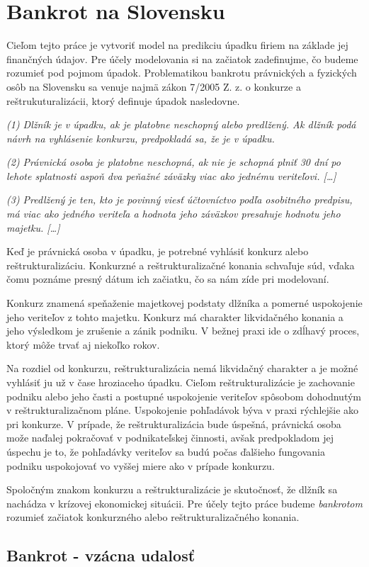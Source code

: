 \section{Bankrot na Slovensku}
\label{bankruptcy}

Cieľom tejto práce je vytvoriť model na predikciu úpadku firiem na základe jej finančných údajov.
Pre účely modelovania si na začiatok zadefinujme, čo budeme rozumieť pod pojmom úpadok.
Problematikou bankrotu právnických a fyzických osôb na Slovensku sa venuje najmä zákon 7/2005 Z. z. o konkurze a reštrukuturalizácii,
ktorý definuje úpadok nasledovne.

\bigskip
\textit{(1)
Dlžník je v úpadku, ak je platobne neschopný alebo predlžený. Ak dlžník podá návrh na vyhlásenie konkurzu, predpokladá sa, že je v úpadku.}

\textit{(2)
Právnická osoba je platobne neschopná, ak nie je schopná plniť 30 dní po lehote splatnosti aspoň dva peňažné záväzky viac ako jednému veriteľovi. […]}

\textit{(3)
Predlžený je ten, kto je povinný viesť účtovníctvo podľa osobitného predpisu, má viac ako jedného veriteľa a hodnota jeho záväzkov presahuje hodnotu jeho majetku. […]}
\bigskip

Keď je právnická osoba v úpadku, je potrebné vyhlásiť konkurz alebo reštrukturalizáciu.
Konkurzné a reštrukturalizačné konania schvaľuje súd, vďaka čomu poznáme presný dátum ich začiatku, čo sa nám zíde pri modelovaní.

Konkurz znamená speňaženie majetkovej podstaty dlžníka a pomerné uspokojenie jeho veriteľov z tohto majetku.
Konkurz má charakter likvidačného konania a jeho výsledkom je zrušenie a zánik podniku.
V bežnej praxi ide o zdĺhavý proces, ktorý môže trvať aj niekoľko rokov.

Na rozdiel od konkurzu, reštrukturalizácia nemá likvidačný charakter a je možné vyhlásiť ju už v čase hroziaceho úpadku.
Cieľom reštrukturalizácie je zachovanie podniku alebo jeho časti a postupné uspokojenie veriteľov spôsobom dohodnutým v reštrukturalizačnom pláne.
Uspokojenie pohľadávok býva v praxi rýchlejšie ako pri konkurze.
V prípade, že reštrukturalizácia bude úspešná, právnická osoba može naďalej pokračovať v podnikateľskej činnosti,
avšak predpokladom jej úspechu je to, že pohľadávky veriteľov sa budú počas ďalšieho fungovania podniku uspokojovať vo vyššej miere ako v prípade konkurzu.

Spoločným znakom konkurzu a reštrukturalizácie je skutočnosť, že dlžník sa nachádza v krízovej ekonomickej situácii.
Pre účely tejto práce budeme \emph{bankrotom} rozumieť začiatok konkurzného alebo reštrukturalizačného konania.

\subsection{Bankrot - vzácna udalosť}